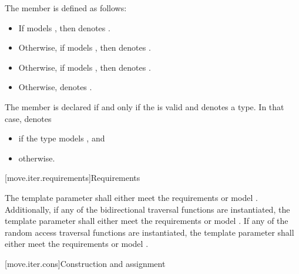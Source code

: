 \pnum
The member   is defined
as follows:
\begin{itemize}
\item
If  models ,
then  denotes .
\item
Otherwise, if  models ,
then  denotes .
\item
Otherwise, if  models ,
then  denotes .
\item
Otherwise,  denotes .
\end{itemize}

\pnum
The member   is declared
if and only if the 
is valid and denotes a type.
In that case,  denotes
\begin{itemize}
\item
{} if
the type
 models
, and
\item
{} otherwise.
\end{itemize}

[move.iter.requirements]{Requirements}

\pnum
The template parameter  shall either
meet the  requirements
or model .
Additionally, if any of the bidirectional traversal
functions are instantiated, the template parameter shall either
meet the  requirements
or model .
If any of the random access traversal functions are instantiated, the
template parameter shall either
meet the  requirements
or model
.

[move.iter.cons]{Construction and assignment}

